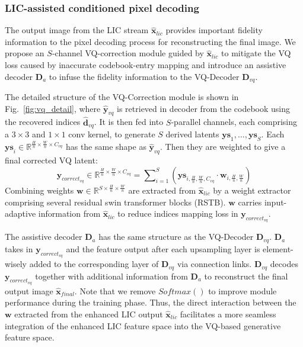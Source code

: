 \subsubsection{LIC-assisted conditioned pixel decoding} The output image from the LIC stream ${\hat{\textbf{x}}}_{lic}$ provides important fidelity information to the pixel decoding process for reconstructing the final image. We propose an $S$-channel VQ-correction module guided by $\hat{\textbf{x}}_{lic}$ to mitigate the VQ loss caused by inaccurate codebook-entry mapping and introduce an assistive decoder $\textbf{D}_{a}$ to infuse the fidelity information to the VQ-Decoder $\textbf{D}_{vq}$. 

The detailed structure of the VQ-Correction module is shown in Fig.~\ref{fig:vq_detail}, where $\hat{\textbf{y}}_{vq}$ is retrieved in decoder from the codebook using the recovered indices $\hat{\textbf{d}}_{vq}$. It is then fed into $S$-parallel channels, each comprising a $3\!\times\!3$ and $1\!\times\!1$ conv kernel, to generate $S$ derived latents $\textbf{ys}_{1},\ldots,\textbf{ys}_{S}$. Each $\textbf{ys}_{i}\in \mathbb{R}^{\frac{H}{n} \times \frac{W}{n} \times C_{vq}}$ has the same shape as $\hat{\textbf{y}}_{vq}$. Then they are weighted to give a final corrected VQ latent: 
\begin{equation}
\textbf{y}_{correct_{vq}}\!\in\!\mathbb{R}^{\frac{H}{n} \times \frac{W}{n} \times C_{vq}} \!= \!\sum\nolimits_{i=1}^{S} \!\left( \textbf{ys}_{i,\frac{H}{n},\frac{W}{n},C_{vq}} \cdot \textbf{w}_{i,\frac{H}{n},\frac{W}{n}} \right)
\end{equation}
Combining weights $\textbf{w}\!\in\!\mathbb{R}^{S\times\frac{H}{n}\times\frac{W}{n}}$ are extracted from $\hat{\textbf{x}}_{lic}$ by a weight extractor comprising several residual swin transformer blocks (RSTB). $\textbf{w}$ carries input-adaptive information from $\hat{\textbf{x}}_{lic}$ to reduce indices mapping loss in $\textbf{y}_{correct_{vq}}$. 

The assistive decoder $\textbf{D}_{a}$ has the same structure as the VQ-Decoder $\textbf{D}_{vq}$.  $\textbf{D}_{a}$ takes in $\textbf{y}_{correct_{vq}}$ and the feature output after each upsampling layer is element-wisely added to the corresponding layer of $\textbf{D}_{vq}$ via connection links. $\textbf{D}_{vq}$ decodes $\textbf{y}_{correct_{vq}}$ together with additional information from $\textbf{D}_{a}$ to reconstruct the final output image ${\hat{\textbf{x}}}_{final}$. Note that we remove $Softmax()$ 
 to improve module performance during the training phase. Thus, the direct interaction between the $\textbf{w}$ extracted from the enhanced LIC output $\hat{\textbf{x}}_{lic}$ facilitates a more seamless integration of the enhanced LIC feature space into the VQ-based generative feature space. 

